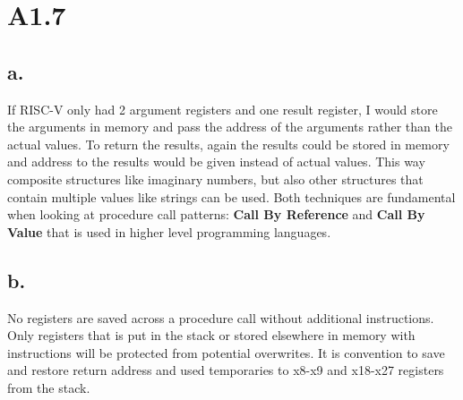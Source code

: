 \section*{A1.7}
\subsection*{a.}
If RISC-V only had 2 argument registers and one result register, I would store the arguments in memory and pass the address of the arguments rather than the actual values.
To return the results, again the results could be stored in memory and address to the results would be given instead of actual values. 
This way composite structures like imaginary numbers, but also other structures that contain multiple values like strings can be used.
Both techniques are fundamental when looking at procedure call patterns: \textbf{Call By Reference} and \textbf{Call By Value} that is used in higher level programming languages.

\subsection*{b.}
No registers are saved across a procedure call without additional instructions.
Only registers that is put in the stack or stored elsewhere in memory with instructions will be protected from potential overwrites.
It is convention to save and restore return address and used temporaries to x8-x9 and x18-x27 registers from the stack.